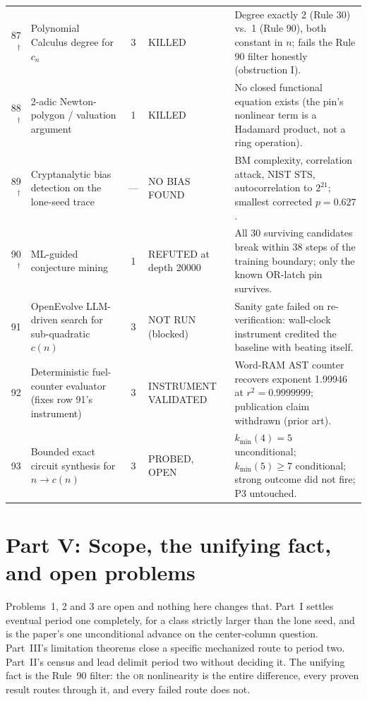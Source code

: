 \documentclass[11pt]{article}
\theoremstyle{definition}
\begin{document}
{\begin{longtable}{@{}r p{4.0cm} c p{1.7cm} p{6.1cm}@{}}
87$^\dagger$ & Polynomial Calculus degree for $c_n$ & 3 & KILLED & Degree exactly 2 (Rule 30) vs.\ 1 (Rule 90), both constant in $n$; fails the Rule 90 filter honestly (obstruction I). \\
88$^\dagger$ & 2-adic Newton-polygon / valuation argument & 1 & KILLED & No closed functional equation exists (the pin's nonlinear term is a Hadamard product, not a ring operation). \\
89$^\dagger$ & Cryptanalytic bias detection on the lone-seed trace & --- & NO BIAS FOUND & BM complexity, correlation attack, NIST STS, autocorrelation to $2^{21}$; smallest corrected $p=0.627$. \\
90$^\dagger$ & ML-guided conjecture mining & 1 & REFUTED at depth 20000 & All 30 surviving candidates break within 38 steps of the training boundary; only the known OR-latch pin survives. \\
91 & OpenEvolve LLM-driven search for sub-quadratic $c(n)$ & 3 & NOT RUN (blocked) & Sanity gate failed on re-verification: wall-clock instrument credited the baseline with beating itself. \\
92 & Deterministic fuel-counter evaluator (fixes row 91's instrument) & 3 & INSTRUMENT VALIDATED & Word-RAM AST counter recovers exponent 1.99946 at $r^2=0.9999999$; publication claim withdrawn (prior art). \\
93 & Bounded exact circuit synthesis for $n\to c(n)$ & 3 & PROBED, OPEN & $k_{\min}(4)=5$ unconditional; $k_{\min}(5)\ge7$ conditional; strong outcome did not fire; P3 untouched. \\
\end{longtable}
}

\section{Part V: Scope, the unifying fact, and open problems}
\label{sec:scope}


Problems~1, 2 and 3 are open and nothing here changes that. Part~I settles
eventual period one completely, for a class strictly larger than the lone seed,
and is the paper's one unconditional advance on the center-column question.
Part~III's limitation theorems close a specific mechanized route to period two.
Part~II's census and lead delimit period two without deciding it. The unifying
fact is the Rule~90 filter: the \textsc{or} nonlinearity is the entire
difference, every proven result routes through it, and every failed route does
not.
\end{document}
